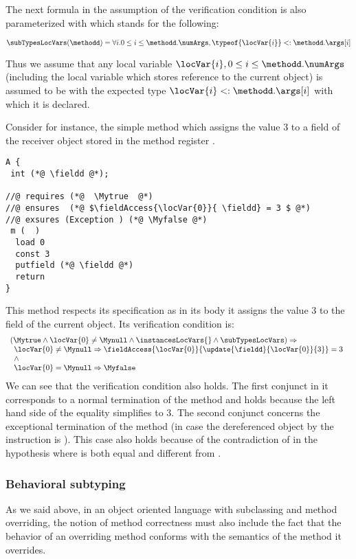 The next formula in the assumption of the verification condition is
\instancesLocVars{} also parameterized with \methodd{} which stands for the
following:

$$ \subTypesLocVars (\methodd)  =  \forall i.
 0 \le i \le \methodd.\numArgs,  \typeof{\locVar{i}} <: \methodd. \args[i]
$$

Thus we assume that any local variable $\locVar{i}, 0 \le i \le \methodd.\numArgs$ 
 (including the local variable  which stores reference to the current
object) is assumed to be with the expected type $\locVar{i} <: \methodd. \args[i]$  with which it is declared.

Consider for instance, the simple method which assigns the value 3
to a field \fieldd{} of the receiver object stored in the method register
.  
\begin{lstlisting}[frame=trbl]
A {
 int (*@ \fieldd @*);

//@ requires (*@  \Mytrue  @*)
//@ ensures  (*@ $\fieldAccess{\locVar{0}}{ \fieldd} = 3 $ @*)
//@ exsures (Exception ) (*@ \Myfalse @*)
 m (  )
  load 0
  const 3 
  putfield (*@ \fieldd @*)
  return
} 
\end{lstlisting}

This method respects its specification as in its body it assigns the value 3
to the field \fieldd{} of the current object. Its verification condition is:  
$$  \begin{array}{l} (\Mytrue  \wedge \locVar{0} \neq \Mynull   \wedge
  \instancesLocVars{} \wedge \subTypesLocVars  ) \Rightarrow\\   
  \begin{array}{l}
 \locVar{0} \neq \Mynull \Rightarrow \fieldAccess{\locVar{0}}{\update{
  \fieldd}{\locVar{0} } {3}} = 3 \\ 
  \wedge \\
\locVar{0} = \Mynull \Rightarrow \Myfalse 
\end{array}  \end{array}
  $$
We can see that the verification condition also holds. The first conjunct in it
 corresponds to a normal termination of the method 
and holds because the left hand side of the equality simplifies to 3. The
second conjunct concerns the exceptional termination of the method (in case the
dereferenced object by the instruction \putfield{} is  \Mynull). This case
also holds because of the contradiction of in the hypothesis where 
is both  equal and different from \Mynull.


\subsubsection{Behavioral subtyping}
As we said above, in an object oriented language with subclassing and 
method overriding, the notion of method correctness 
must also include the fact that the behavior of an overriding 
 method conforms with the semantics of the method it overrides.


